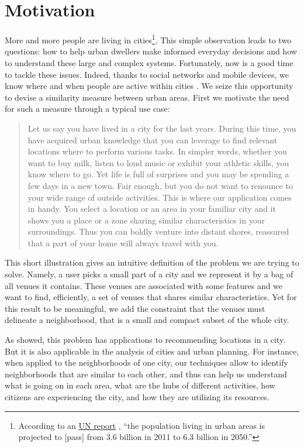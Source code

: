 \section{Motivation}
\label{sec:motivation}

More and more people are living in cities\footnote{According to an
\href{http://esa.un.org/unup/pdf/WUP2011_Highlights.pdf}{UN report}
\autocite{UNreport12}, \enquote{the population living in urban areas is
projected to [pass] from 3.6 billion in 2011 to 6.3 billion in 2050.}}. This
simple observation leads to two questions: how to help urban dwellers make
informed everyday decisions and how to understand these large and complex
systems. Fortunately, now is a good time to tackle these issues. Indeed, thanks
to social networks and mobile devices, we know where and when people are
active within cities \autocite{SpatialComputing12}. We seize this opportunity
to devise a similarity measure between urban areas. First we motivate the
need for such a measure through a typical use case:

\begin{quote}
Let us say you have lived in a city for the last years. During this time,
you have acquired urban knowledge that you can leverage to find relevant
locations where to perform various tasks. In simpler words, whether you want
to buy milk, listen to loud music or exhibit your athletic skills, you know
where to go. Yet life is full of surprises and you may be spending a few
days in a new town. Fair enough, but you do not want to renounce to your
wide range of outside activities. This is where our application comes in
handy. You select a location or an area in your familiar city and it shows
you a place or a zone sharing similar characteristics in your surroundings.
Thus you can boldly venture into distant shores, reassured that a part of
your home will always travel with you.
\end{quote}

This short illustration gives an intuitive definition of the problem we are
trying to solve. Namely, a user picks a small part of a city and we represent
it by a bag of all venues it contains. These venues are associated with some
features and we want to find, efficiently, a set of venues that shares similar
characteristics. Yet for this result to be meaningful, we add the constraint
that the venues must delineate a neighborhood, that is a small and compact
subset of the whole city.

As showed, this problem has applications to recommending locations in a city.
But it is also applicable in the analysis of cities and urban planning. For
instance, when applied to the neighborhoods of one city, our techniques allow
to identify neighborhoods that are similar to each other, and thus can help us
understand what is going on in each area, what are the hubs of different
activities, how citizens are experiencing the city, and how they are utilizing
its resources. 
